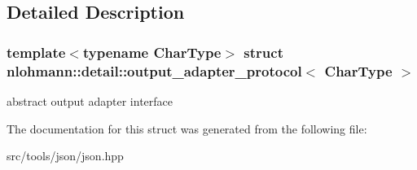 \subsection{Detailed Description}
\subsubsection*{template$<$typename Char\+Type$>$\newline
struct nlohmann\+::detail\+::output\+\_\+adapter\+\_\+protocol$<$ Char\+Type $>$}

abstract output adapter interface 

The documentation for this struct was generated from the following file\+:\begin{DoxyCompactItemize}
\item 
src/tools/json/json.\+hpp\end{DoxyCompactItemize}
